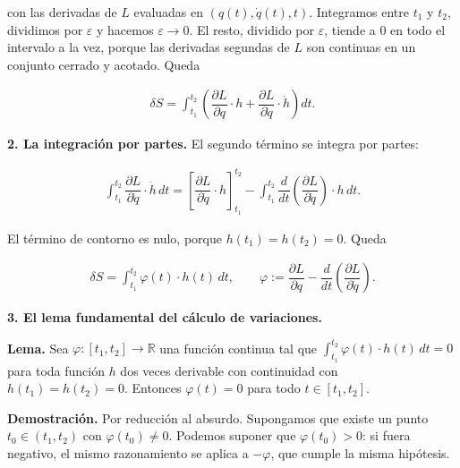\documentclass[11pt,a4paper,spanish]{book}
\begin{document}
con las derivadas de \(L\) evaluadas en \((q(t), \dot{q}(t), t)\).
Integramos entre \(t_1\) y \(t_2\), dividimos por \(\varepsilon\) y
hacemos \(\varepsilon \to 0\). El resto, dividido por \(\varepsilon\),
tiende a \(0\) en todo el intervalo a la vez, porque las derivadas
segundas de \(L\) son continuas en un conjunto cerrado y acotado. Queda

\[
\begin{aligned}
\delta S = \int_{t_1}^{t_2} \left(\dfrac{\partial L}{\partial q} \cdot h + \dfrac{\partial L}{\partial \dot{q}} \cdot \dot{h}\right) dt.
\end{aligned}
\]

\textbf{2. La integración por partes.} El segundo término se integra por
partes:

\[
\begin{aligned}
\int_{t_1}^{t_2} \dfrac{\partial L}{\partial \dot{q}} \cdot \dot{h} \,dt = \left[\dfrac{\partial L}{\partial \dot{q}} \cdot h\right]_{t_1}^{t_2} - \int_{t_1}^{t_2} \dfrac{d}{dt}\left(\dfrac{\partial L}{\partial \dot{q}}\right) \cdot h \,dt.
\end{aligned}
\]

El término de contorno es nulo, porque \(h(t_1) = h(t_2) = 0\). Queda

\[
\begin{aligned}
\delta S = \int_{t_1}^{t_2} \varphi(t) \cdot h(t) \,dt, \qquad \varphi := \dfrac{\partial L}{\partial q} - \dfrac{d}{dt}\left(\dfrac{\partial L}{\partial \dot{q}}\right).
\end{aligned}
\]

\textbf{3. El lema fundamental del cálculo de variaciones.}

\textbf{Lema.} Sea \(\varphi: [t_1, t_2] \to \mathbb{R}\) una función
continua tal que \(\int_{t_1}^{t_2} \varphi(t) \cdot h(t) \,dt = 0\)
para toda función \(h\) dos veces derivable con continuidad con
\(h(t_1) = h(t_2) = 0\). Entonces \(\varphi(t) = 0\) para todo
\(t \in [t_1, t_2]\).

\textbf{Demostración.} Por reducción al absurdo. Supongamos que existe
un punto \(t_0 \in (t_1, t_2)\) con \(\varphi(t_0) \neq 0\). Podemos
suponer que \(\varphi(t_0) > 0\): si fuera negativo, el mismo
razonamiento se aplica a \(-\varphi\), que cumple la misma hipótesis.
\end{document}
